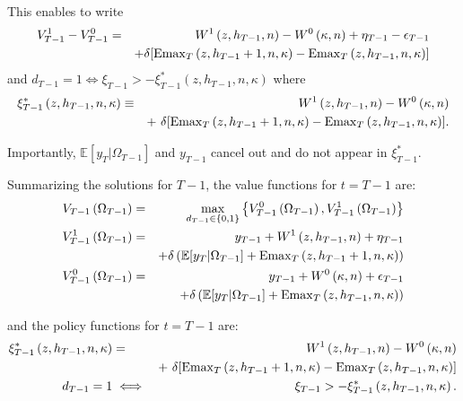 \indent This enables to write
\begin{eqnarray}
V^1_{T-1} - V^0_{T-1} &=& W^1\left( z, h_{T-1}, n\right) - W^0\left( \kappa, n\right) + \eta_{T-1} - \epsilon_{T-1} \nonumber \\
& & + \delta [ \operatorname{Emax}_T\left(z, h_{T-1}+1, n, \kappa\right) - \operatorname{Emax}_T\left(z, h_{T-1}, n, \kappa \right)]
\end{eqnarray}
\noindent and $d_{T-1} = 1 \iff \xi_{T-1} > -\xi^*_{T-1}\left(z, h_{T-1}, n, \kappa\right)$ where
\begin{eqnarray}
\xi^*_{T-1}\left(z, h_{T-1}, n, \kappa \right) &\equiv & W^1\left(z, h_{T-1}, n\right) - W^0\left(\kappa, n\right) \nonumber \\
& &+\ \delta [ \operatorname{Emax}_T\left(z, h_{T-1}+1, n, \kappa\right) - \operatorname{Emax}_T\left(z, h_{T-1}, n, \kappa \right)].
\end{eqnarray}

\indent Importantly, $\mathbb{E} [y_T | \Omega_{T-1}]$ and $y_{T-1}$ cancel out and do not appear in $\xi_{T-1}^*$.

\indent Summarizing the solutions for $T-1$, the value functions for $t = T-1$ are:
\begin{eqnarray}
V_{T-1}\left(\Omega_{T-1}\right) &=& \max_{d_{T-1} \in \{0, 1\}} \left\{V^{0}_{T-1} \left(\Omega_{T-1} \right),V^{1}_{T-1} \left(\Omega_{T-1} \right)\right\} \label{eq:valueFun_T-1} \\ 
V^{1}_{T-1} \left(\Omega_{T-1} \right) &=& y_{T-1} + W^{1} \left(z,h_{T-1},n\right) + \eta_{T-1} \nonumber \\
& & + \delta \left( \mathbb{E} [y_T | \Omega_{T-1}] + \operatorname{Emax}_T \left(z,h_{T-1}+1,n,\kappa \right) \right) \\
V^{0}_{T-1} \left(\Omega_{T-1} \right) &=& y_{T-1} + W^0 \left( \kappa, n \right) + \epsilon_{T-1} \nonumber \\
& & + \delta \left( \mathbb{E} [y_T | \Omega_{T-1}] + \operatorname{Emax}_T \left(z,h_{T-1},n,\kappa \right) \right)
\end{eqnarray}

\noindent and the policy functions for $t = T-1$ are:
\begin{eqnarray}
\xi^*_{T-1}\left(z, h_{T-1}, n, \kappa \right) &=& W^1\left(z, h_{T-1}, n\right) - W^0\left(\kappa, n\right) \nonumber \\
& &+\ \delta [ \operatorname{Emax}_T\left(z, h_{T-1}+1, n, \kappa\right) - \operatorname{Emax}_T\left(z, h_{T-1}, n, \kappa \right)] \\
d_{T-1} = 1 & \iff &  \xi_{T-1} > -\xi^*_{T-1}\left(z, h_{T-1}, n, \kappa\right) \label{eq:policyFun_T-1}.
\end{eqnarray}


